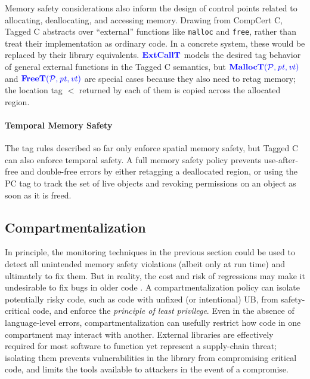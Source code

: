 Memory safety considerations also inform the design of control points related to allocating,
deallocating, and accessing memory.
Drawing from CompCert C, Tagged C abstracts over
``external'' functions like {\tt malloc} and {\tt free}, rather than treat their implementation as
ordinary code. In a concrete system, these would be replaced by their library equivalents. 
\(\color{blue} \mathbf{ExtCallT}\) models the desired tag behavior of general external functions in the Tagged C
semantics, but \(\color{blue} \mathbf{MallocT}(\mathcal{\color{blue} P\mathit{}}, \mathit{\color{blue} pt}, \mathit{\color{blue} vt})\) and \(\color{blue} \mathbf{FreeT}(\mathcal{\color{blue} P\mathit{}},\mathit{\color{blue} pt},\mathit{\color{blue} vt})\) are special cases because they also need to retag memory;
the location tag \(\lt\) returned by each of them is copied across the allocated region.

\paragraph*{Temporal Memory Safety}

The tag rules described so far only enforce spatial memory safety, but Tagged C can 
also enforce temporal safety. A full memory safety policy prevents use-after-free and
double-free errors by either retagging a deallocated region, or using the PC tag
to track the set of live objects and revoking permissions on an object as soon as it is freed.

\subsection{Compartmentalization}
\label{ch4:sec:compartments}

In principle, the monitoring techniques in the previous section could be used
to detect all unintended memory safety violations (albeit only at run time) and ultimately to fix them.
But in reality, the cost and risk of regressions may make it
undesirable to fix bugs in older code \cite{Bessey10:Coverity}.  
%
A compartmentalization policy can isolate potentially risky code, such as code with unfixed
(or intentional) UB, from safety-critical code, and enforce the {\em principle of least privilege}. 
Even in the absence of language-level errors, compartmentalization can usefully 
restrict how code in one compartment may interact with another. External libraries are
effectively required for most software to function yet represent a supply-chain threat; isolating 
them prevents vulnerabilities in the library from compromising critical code,
and limits the tools available to attackers in the event of a compromise.

